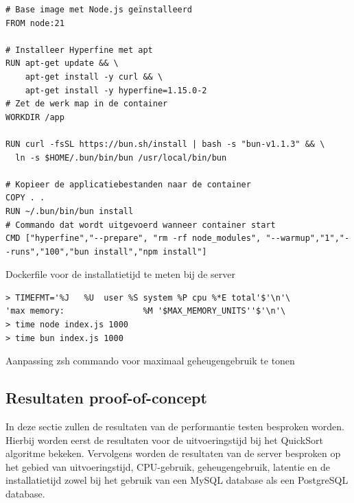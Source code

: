 \begin{listing}[H]
  \centering
  \begin{verbatim}
# Base image met Node.js geïnstalleerd
FROM node:21

# Installeer Hyperfine met apt
RUN apt-get update && \
    apt-get install -y curl && \
    apt-get install -y hyperfine=1.15.0-2
# Zet de werk map in de container
WORKDIR /app

RUN curl -fsSL https://bun.sh/install | bash -s "bun-v1.1.3" && \
  ln -s $HOME/.bun/bin/bun /usr/local/bin/bun

# Kopieer de applicatiebestanden naar de container
COPY . .
RUN ~/.bun/bin/bun install
# Commando dat wordt uitgevoerd wanneer container start
CMD ["hyperfine","--prepare", "rm -rf node_modules", "--warmup","1","--runs","100","bun install","npm install"]
      \end{verbatim}
      \caption[Dockerfile meting installatietijd]{\label{code:dockerinstall}Dockerfile voor de installatietijd te meten bij de server}
\end{listing}

\begin{listing}[H]
  \centering
  \begin{verbatim}
> TIMEFMT='%J   %U  user %S system %P cpu %*E total'$'\n'\
'max memory:                %M '$MAX_MEMORY_UNITS''$'\n'\
> time node index.js 1000
> time bun index.js 1000
      \end{verbatim}
      \caption[Dockerfile time commando]{\label{code:zshmemory}Aanpassing zsh commando voor maximaal geheugengebruik te tonen}
\end{listing}

\subsection{Resultaten proof-of-concept}
In deze sectie zullen de resultaten van de performantie testen besproken worden.
Hierbij worden eerst de resultaten voor de uitvoeringstijd bij het QuickSort algoritme bekeken.
Vervolgens worden de resultaten van de server besproken op het gebied van uitvoeringstijd, CPU-gebruik, geheugengebruik, latentie en de installatietijd
zowel bij het gebruik van een MySQL database als een PostgreSQL database.

